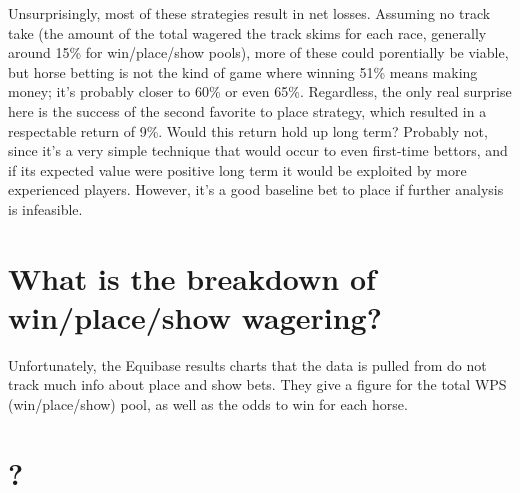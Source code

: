 \documentclass{article}
\begin{document}
Unsurprisingly, most of these strategies result in net losses. Assuming no track take (the amount of the total wagered the track skims for each race, generally around 15\% for win/place/show pools), more of these could porentially be viable, but horse betting is not the kind of game where winning 51\% means making money; it's probably closer to 60\% or even 65\%. Regardless, the only real surprise here is the success of the second favorite to place strategy, which resulted in a respectable return of 9\%. Would this return hold up long term? Probably not, since it's a very simple technique that would occur to even first-time bettors, and if its expected value were positive long term it would be exploited by more experienced players. However, it's a good baseline bet to place if further analysis is infeasible.

\section*{What is the breakdown of win/place/show wagering?}

Unfortunately, the Equibase results charts that the data is pulled from do not track much info about place and show bets. They give a figure for the total WPS (win/place/show) pool, as well as the odds to win for each horse.

\section*{?}
\end{document}
